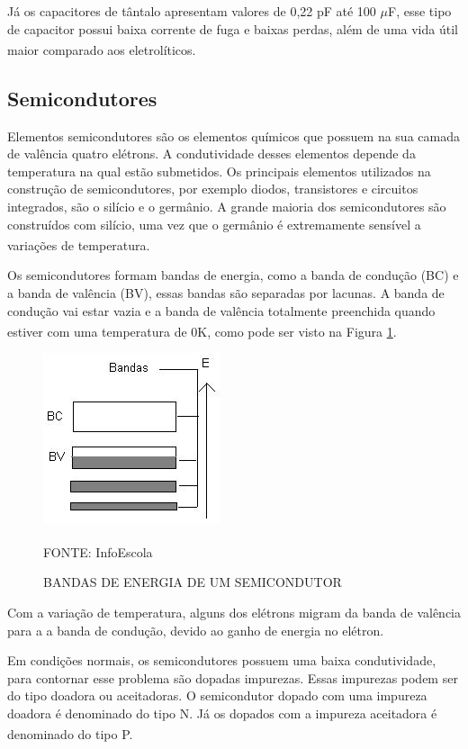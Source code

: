 \documentclass[
	12pt,				%
	openright,			%
	oneside,			%
	a4paper,			%
	english,			%
	french,				%
	spanish,			%
	brazil,				%
	oldfontcommands
	]{abntex2}
\begin{document}
	Já os capacitores de tântalo apresentam valores de 0,22 pF até 100 $\mu$F, esse tipo de capacitor possui baixa corrente de fuga e baixas perdas, além de uma vida útil maior comparado aos eletrolíticos.\textsuperscript{\cite{x7r}}

\subsection[Semicondutores]{Semicondutores}

	Elementos semicondutores são os elementos químicos que possuem na sua camada de valência quatro elétrons. A condutividade desses elementos depende da temperatura na qual estão submetidos. Os principais elementos utilizados na construção de semicondutores, por exemplo diodos, transistores e circuitos integrados, são o silício e o germânio. A grande maioria dos semicondutores são construídos com silício, uma vez que o germânio é extremamente sensível a variações de temperatura.\textsuperscript{\cite{semicondutores}}
	
	Os semicondutores formam bandas de energia, como a banda de condução (BC) e a banda de valência (BV), essas bandas são separadas por lacunas. A banda de condução vai estar vazia e a banda de valência totalmente preenchida quando estiver com uma temperatura de 0K, como pode ser visto na Figura \ref{Fig_bandas}.\textsuperscript{\cite{semicondutores2}}
	
	\begin{figure}[th]
		\caption{BANDAS DE ENERGIA DE UM SEMICONDUTOR}
		\label{Fig_bandas}
		\centering
		\includegraphics[width=0.3\linewidth]{./figs/banda}
			
		\begin{small}
			FONTE: InfoEscola\textsuperscript{\cite{semicondutores2}}
		\end{small}		
	\end{figure}
	\pagebreak
	Com a variação de temperatura, alguns dos elétrons migram da banda de valência para a a banda de condução, devido ao ganho de energia no elétron.

	Em condições normais, os semicondutores possuem uma baixa condutividade, para contornar esse problema são dopadas impurezas. Essas impurezas podem ser do tipo doadora ou aceitadoras. O semicondutor dopado com uma impureza doadora é denominado do tipo N. Já os dopados com a impureza aceitadora é denominado do tipo P.\textsuperscript{\cite{semicondutores2}}
\end{document}
